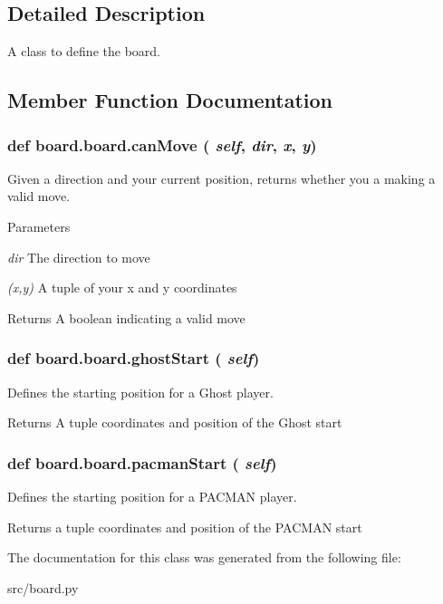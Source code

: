 \subsection{Detailed Description}
A class to define the board. 

\subsection{Member Function Documentation}
\hypertarget{classboard_1_1board_a0bcaab198cdcc0187bfa6b29b7541139}{
\subsubsection[{canMove}]{\setlength{\rightskip}{0pt plus 5cm}def board.board.canMove ( {\em self}, \/   {\em dir}, \/   {\em x}, \/   {\em y})}}
\label{classboard_1_1board_a0bcaab198cdcc0187bfa6b29b7541139}


Given a direction and your current position, returns whether you a making a valid move. 


\begin{DoxyParams}{Parameters}
\item[{\em dir}]The direction to move \item[{\em (x,y)}]A tuple of your x and y coordinates \end{DoxyParams}
\begin{DoxyReturn}{Returns}
A boolean indicating a valid move 
\end{DoxyReturn}
\hypertarget{classboard_1_1board_ad491812ee3e354dc1ecc6ae3a5822f43}{
\subsubsection[{ghostStart}]{\setlength{\rightskip}{0pt plus 5cm}def board.board.ghostStart ( {\em self})}}
\label{classboard_1_1board_ad491812ee3e354dc1ecc6ae3a5822f43}


Defines the starting position for a Ghost player. 

\begin{DoxyReturn}{Returns}
A tuple coordinates and position of the Ghost start 
\end{DoxyReturn}
\hypertarget{classboard_1_1board_a5b482bb9a90ccfa9f2f25ac4abd068b2}{
\subsubsection[{pacmanStart}]{\setlength{\rightskip}{0pt plus 5cm}def board.board.pacmanStart ( {\em self})}}
\label{classboard_1_1board_a5b482bb9a90ccfa9f2f25ac4abd068b2}


Defines the starting position for a PACMAN player. 

\begin{DoxyReturn}{Returns}
a tuple coordinates and position of the PACMAN start 
\end{DoxyReturn}


The documentation for this class was generated from the following file:\begin{DoxyCompactItemize}
\item 
src/board.py\end{DoxyCompactItemize}
